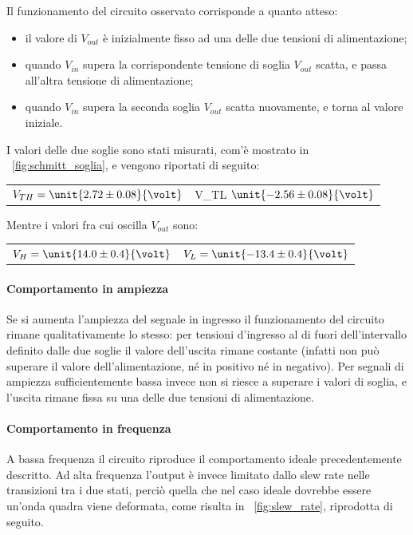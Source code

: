 \documentclass[10pt,a4paper]{article}
\begin{document}
Il funzionamento del circuito osservato corrisponde a quanto atteso:
\begin{itemize}
\item il valore di $V_{out}$ è inizialmente fisso ad una delle due tensioni di alimentazione;
\item quando $V_{in}$ supera la corrispondente tensione di soglia $V_{out}$ scatta, e passa all'altra tensione di alimentazione;
\item quando $V_{in}$ supera la seconda soglia $V_{out}$ scatta nuovamente, e torna al valore iniziale.
\end{itemize}

I valori delle due soglie sono stati misurati, com'è mostrato in \figurename{~\ref{fig:schmitt_soglia}}, e vengono riportati di seguito:

\begin{table}[H]
	\centering
	\begin{tabular}{cc}
        $ V_{TH} = \unit{2.72 \pm 0.08}{\volt}$  & V_{TL} $\unit{-2.56 \pm 0.08}{\volt}$
	\end{tabular}
\end{table}

Mentre i valori fra cui oscilla $V_{out}$ sono:

\begin{table}[H]
	\centering
	\begin{tabular}{cc}
        $ V_{H} = \unit{14.0 \pm 0.4}{\volt}$  & $V_{L} = \unit{-13.4 \pm 0.4}{\volt}$
	\end{tabular}
\end{table}

\paragraph{Comportamento in ampiezza} Se si aumenta l'ampiezza del segnale in ingresso il funzionamento del circuito rimane qualitativamente lo stesso: per tensioni d'ingresso al di fuori dell'intervallo definito dalle due soglie il valore dell'uscita rimane costante (infatti non può superare il valore dell'alimentazione, né in positivo né in negativo). Per segnali di ampiezza sufficientemente bassa invece non si riesce a superare i valori di soglia, e l'uscita rimane fissa su una delle due tensioni di alimentazione.

\paragraph{Comportamento in frequenza} A bassa frequenza il circuito riproduce il comportamento ideale precedentemente descritto. Ad alta frequenza l'output è invece limitato dallo slew rate nelle transizioni tra i due stati, perciò quella che nel caso ideale dovrebbe essere un'onda quadra viene deformata, come risulta in \figurename{~\ref{fig:slew_rate}}, riprodotta di seguito.
\end{document}
